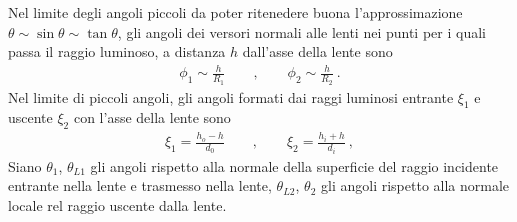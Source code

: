 \documentclass[letterpaper,10pt,italian]{jupyterBook}
\begin{document}
\sphinxAtStartPar
Nel limite degli angoli piccoli da poter ritenedere buona l’approssimazione \(\theta \sim \sin \theta \sim \tan \theta\), gli angoli dei versori normali alle lenti nei punti per i quali passa il raggio luminoso, a distanza \(h\) dall’asse della lente sono
\begin{equation*}
\begin{split}\phi_1 \sim \frac{h}{R_1} \qquad , \qquad \phi_2 \sim \frac{h}{R_2} \ .\end{split}
\end{equation*}
\sphinxAtStartPar
Nel limite di piccoli angoli, gli angoli formati dai raggi luminosi entrante \(\xi_1\) e uscente \(\xi_2\) con l’asse della lente sono
\begin{equation}\label{equation:ch/waves/optics-lens:eq:lens:angles:approx}
\begin{split}\xi_1 = \frac{h_o - h}{d_0} \qquad , \qquad \xi_2 = \frac{h_i + h}{d_i} \ , \end{split}
\end{equation}
\sphinxAtStartPar
Siano \(\theta_1\), \(\theta_{L1}\) gli angoli rispetto alla normale della superficie del raggio incidente entrante nella lente e trasmesso nella lente, \(\theta_{L2}\), \(\theta_2\) gli angoli rispetto alla normale locale rel raggio uscente dalla lente.
\end{document}
